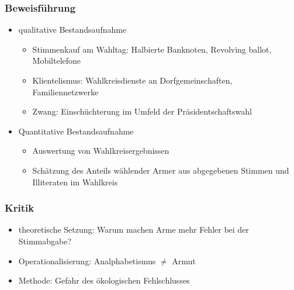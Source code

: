 \documentclass{beamer}
\begin{document}
\begin{frame}
  \frametitle{Beweisführung}
  \begin{itemize}
    \item qualitative Bestandsaufnahme
    \begin{itemize}
      \item Stimmenkauf am Wahltag: Halbierte Banknoten, Revolving ballot, Mobiltelefone
      \item Klientelismus: Wahlkreisdienste an Dorfgemeinschaften, Familiennetzwerke
      \item Zwang: Einschüchterung im Umfeld der Präsidentschaftswahl
    \end{itemize}
    \item Quantitative Bestandsaufnahme
    \begin{itemize}
      \item Auswertung von Wahlkreisergebnissen
      \item Schätzung des Anteils wählender Armer aus abgegebenen Stimmen und Illiteraten im Wahlkreis
    \end{itemize} 
  \end{itemize}
\end{frame}

\begin{frame}
  \frametitle{Kritik}
  \begin{itemize}
    \item theoretische Setzung: Warum machen Arme mehr Fehler bei der Stimmabgabe?
    \item Operationalisierung: Analphabetismus $\neq$ Armut
    \item Methode: Gefahr des ökologischen Fehlschlusses
  \end{itemize}
\end{frame}
\end{document}
